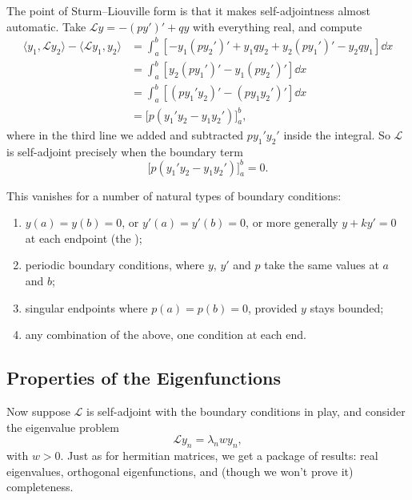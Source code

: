 The point of Sturm--Liouville form is that it makes self-adjointness almost automatic. Take $\mathcal{L}y = -(py')' + qy$ with everything real, and compute
\begin{align*}
    \langle y_1, \mathcal{L} y_2\rangle - \langle \mathcal{L}y_1, y_2 \rangle
    &= \int_a^b \left[-y_1 (p y_2')' + y_1 q y_2 + y_2 (p y_1')' - y_2 q y_1 \right] \dd x \\
    &= \int_a^b \left[y_2 (p y_1')' - y_1 (p y_2')'\right] \dd x \\
    &= \int_a^b \left[(p y_1' y_2)' - (p y_1 y_2')'\right] \dd x \\
    &= \Big[ p (y_1' y_2 - y_1 y_2')\Big]_a^b,
\end{align*}
where in the third line we added and subtracted $p y_1' y_2'$ inside the integral.
So $\mathcal{L}$ is self-adjoint precisely when the boundary term
$$
\Big[ p (y_1' y_2 - y_1 y_2')\Big]_a^b = 0.
$$

This vanishes for a number of natural types of boundary conditions:
\begin{enumerate}[label=(\roman*)]
    \item $y(a) = y(b) = 0$, or $y'(a) = y'(b) = 0$, or more generally $y + k y' = 0$ at each endpoint (the );
    \item periodic boundary conditions, where $y$, $y'$ and $p$ take the same values at $a$ and $b$;
    \item singular endpoints where $p(a) = p(b) = 0$, provided $y$ stays bounded;
    \item any combination of the above, one condition at each end.
\end{enumerate}

\subsection{Properties of the Eigenfunctions}

Now suppose $\mathcal{L}$ is self-adjoint with the boundary conditions in play, and consider the eigenvalue problem
$$
\mathcal{L} y_n = \lambda_n w y_n,
$$
with $w > 0$. Just as for hermitian matrices, we get a package of results: real eigenvalues, orthogonal eigenfunctions, and (though we won't prove it) completeness.

